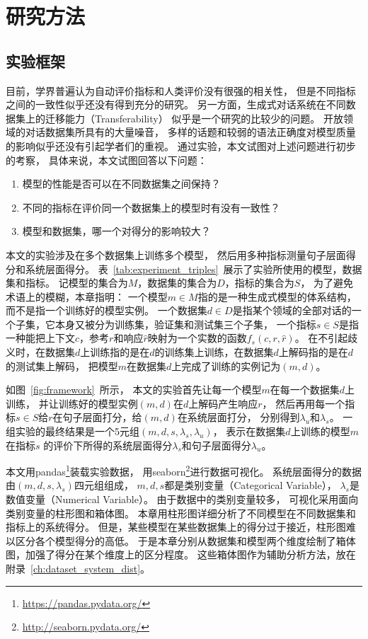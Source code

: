 \chapter{研究方法}\label{ch:method}

\section{实验框架}\label{sec:eval_framework}
目前，学界普遍认为自动评价指标和人类评价没有很强的相关性，
但是不同指标之间的一致性似乎还没有得到充分的研究。
另一方面，生成式对话系统在不同数据集上的迁移能力（Transferability）
似乎是一个研究的比较少的问题。
开放领域的对话数据集所具有的大量噪音，
多样的话题和较弱的语法正确度对模型质量的影响似乎还没有引起学者们的重视。
通过实验，本文试图对上述问题进行初步的考察，
具体来说，本文试图回答以下问题：
\begin{enumerate}
    \item 模型的性能是否可以在不同数据集之间保持？
    \item 不同的指标在评价同一个数据集上的模型时有没有一致性？
    \item 模型和数据集，哪一个对得分的影响较大？
\end{enumerate}

本文的实验涉及在多个数据集上训练多个模型，
然后用多种指标测量句子层面得分和系统层面得分。
表~\ref{tab:experiment_triples}~展示了实验所使用的模型，数据集和指标。
记模型的集合为$M$，数据集的集合为$D$，指标的集合为$S$，
为了避免术语上的模糊，本章指明：
一个模型$m \in M$指的是一种生成式模型的体系结构，而不是指一个训练好的模型实例。
一个数据集$d \in D$是指某个领域的全部对话的一个子集，它本身又被分为训练集，验证集和测试集三个子集，
一个指标$s \in S$是指一种能把上下文$c$，参考$r$和响应$\hat{r}$映射为一个实数的函数$f_s(c, r, \hat{r})$。
在不引起歧义时，在数据集$d$上训练指的是在$d$的训练集上训练，在数据集$d$上解码指的是在$d$的测试集上解码，
把模型$m$在数据集$d$上完成了训练的实例记为$(m, d)$。

如图~\ref{fig:framework}~所示，
本文的实验首先让每一个模型$m$在每一个数据集$d$上训练，
并让训练好的模型实例$(m, d)$在$d$上解码产生响应$r$，
然后再用每一个指标$s \in S$给$r$在句子层面打分，给$(m, d)$在系统层面打分，
分别得到$\lambda_{u}$和$\lambda_{s}$。
一组实验的最终结果是一个5元组$(m, d, s, \lambda_{s}, \lambda_{u})$，
表示在数据集$d$上训练的模型$m$在指标$s$
的评价下所得的系统层面得分$\lambda_s$和句子层面得分$\lambda_u$。

本文用pandas\footnote{\url{https://pandas.pydata.org/}}装载实验数据，
用seaborn\footnote{\url{http://seaborn.pydata.org/}}进行数据可视化。
系统层面得分的数据由$(m, d, s, \lambda_s)$四元组组成，
$m, d, s$都是类别变量（Categorical Variable），
$\lambda_s$是数值变量（Numerical Variable）。
由于数据中的类别变量较多，
可视化采用面向类别变量的柱形图和箱体图。
本章用柱形图详细分析了不同模型在不同数据集和指标上的系统得分。
但是，某些模型在某些数据集上的得分过于接近，柱形图难以区分各个模型得分的高低。
于是本章分别从数据集和模型两个维度绘制了箱体图，加强了得分在某个维度上的区分程度。
这些箱体图作为辅助分析方法，放在附录~\ref{ch:dataset_system_dist}。

